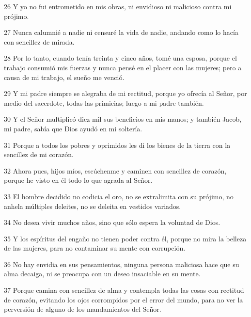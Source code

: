 \par 26 Y yo no fui entrometido en mis obras, ni envidioso ni malicioso contra mi prójimo.

\par 27 Nunca calumnié a nadie ni censuré la vida de nadie, andando como lo hacía con sencillez de mirada.

\par 28 Por lo tanto, cuando tenía treinta y cinco años, tomé una esposa, porque el trabajo consumió mis fuerzas y nunca pensé en el placer con las mujeres; pero a causa de mi trabajo, el sueño me venció.

\par 29 Y mi padre siempre se alegraba de mi rectitud, porque yo ofrecía al Señor, por medio del sacerdote, todas las primicias; luego a mi padre también.

\par 30 Y el Señor multiplicó diez mil sus beneficios en mis manos; y también Jacob, mi padre, sabía que Dios ayudó en mi soltería.

\par 31 Porque a todos los pobres y oprimidos les di los bienes de la tierra con la sencillez de mi corazón.

\par 32 Ahora pues, hijos míos, escúchenme y caminen con sencillez de corazón, porque he visto en él todo lo que agrada al Señor.

\par 33 El hombre decidido no codicia el oro, no se extralimita con su prójimo, no anhela múltiples deleites, no se deleita en vestidos variados.

\par 34 No desea vivir muchos años, sino que sólo espera la voluntad de Dios.

\par 35 Y los espíritus del engaño no tienen poder contra él, porque no mira la belleza de las mujeres, para no contaminar su mente con corrupción.

\par 36 No hay envidia en sus pensamientos, ninguna persona maliciosa hace que su alma decaiga, ni se preocupa con un deseo insaciable en su mente.

\par 37 Porque camina con sencillez de alma y contempla todas las cosas con rectitud de corazón, evitando los ojos corrompidos por el error del mundo, para no ver la perversión de alguno de los mandamientos del Señor.

